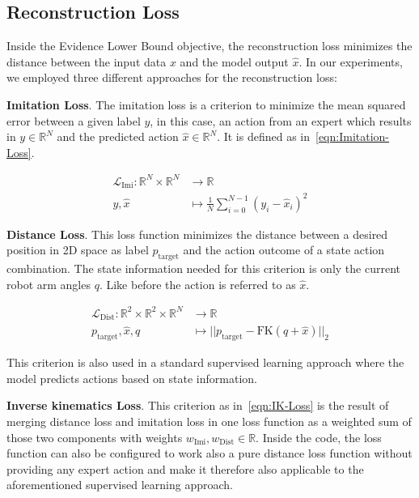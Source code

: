 \subsection{Reconstruction Loss}

Inside the Evidence Lower Bound objective, the reconstruction loss minimizes the distance between the input data $x$ and the model output $\hat{x}$. In our experiments, we employed three different approaches for the reconstruction loss:

\textbf{Imitation Loss}. The imitation loss is a criterion to minimize the mean squared error between a given label $y$, in this case, an action from an expert which results in $y \in \mathbb{R}^N$ and the predicted action $\hat{x} \in \mathbb{R}^N$. It is defined as in~\eqref{eqn:Imitation-Loss}.

\begin{equation}\label{eqn:Imitation-Loss}
    \begin{split}
        \mathcal{L}_\text{Imi}: \mathbb{R}^N \times \mathbb{R}^N & \to \mathbb{R} \\
        y, \hat{x} & \mapsto \frac{1}{N}\sum_{i = 0}^{N-1} \left(y_i - \hat{x}_i\right)^2 
    \end{split}
\end{equation}

\textbf{Distance Loss}. This loss function minimizes the distance between a desired position in 2D space as label $p_\text{target}$ and the action outcome of a state action combination. The state information needed for this criterion is only the current robot arm angles $q$. Like before the action is referred to as $\hat{x}$.

\begin{equation}\label{eqn:Distance-Loss}
    \begin{split}
        \mathcal{L}_\text{Dist}: \mathbb{R}^2 \times \mathbb{R}^2 \times \mathbb{R}^N & \to \mathbb{R} \\
        p_\text{target}, \hat{x}, q & \mapsto ||p_\text{target} - \text{FK}(q + \hat{x})||_2
    \end{split}
\end{equation}

This criterion is also used in a standard supervised learning approach where the model predicts actions based on state information.

\textbf{Inverse kinematics Loss}. This criterion as in~\eqref{eqn:IK-Loss} is the result of merging distance loss and imitation loss in one loss function as a weighted sum of those two components with weights $w_\text{Imi}, w_\text{Dist} \in \mathbb{R}$. Inside the code, the loss function can also be configured to work also a pure distance loss function without providing any expert action and make it therefore also applicable to the aforementioned supervised learning approach. 

